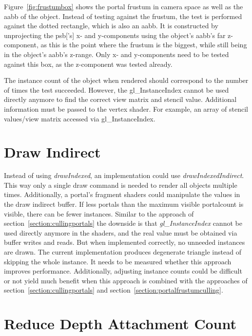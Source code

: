 Figure~\ref{fig:frustumbox} shows the portal frustum in camera space as well as the \gls{aabb} of the object. Instead of testing against the frustum, the test is performed against the dotted rectangle, which is also an \gls{aabb}. It is constructed by unprojecting the \gls{psb}['s] x- and y-components using the object's \gls{aabb}'s far z-component, as this is the point where the frustum is the biggest, while still being in the object's \gls{aabb}'s z-range. Only x- and y-components need to be tested against this box, as the z-component was tested already.


The instance count of the object when rendered should correspond to the number of times the test succeeded. However, the gl\_InstanceIndex cannot be used directly anymore to find the correct view matrix and stencil value. Additional information must be passed to the vertex shader. For example, an array of stencil values/view matrix accessed via gl\_InstanceIndex.

\section{Draw Indirect}
Instead of using \textit{drawIndexed}, an implementation could use \textit{drawIndexedIndirect}. This way only a single draw command is needed to render all objects multiple times. Additionally, a portal's fragment shaders could manipulate the values in the draw indirect buffer. If less portals than the maximum visible \gls{portalcount} is visible, there can be fewer instances. Similar to the approach of section~\ref{section:cullingportals} the downside is that \textit{gl\_InstanceIndex} cannot be used directly anymore in the shaders, and the real value must be obtained via buffer writes and reads. But when implemented correctly, no unneeded instances are drawn. The current implementation produces degenerate triangle instead of skipping the whole instance. It needs to be measured whether this approach improves performance. Additionally, adjusting instance counts could be difficult or not yield much benefit when this approach is combined with the approaches of section~\ref{section:cullingportals} and section~\ref{section:portalfrustumculling}.

\section{Reduce Depth Attachment Count}

